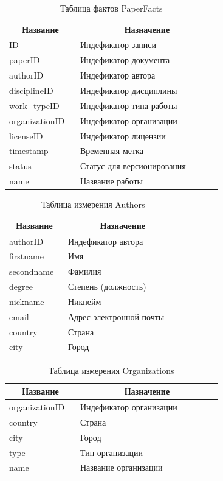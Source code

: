 \documentclass[a4paper,14pt]{extarticle}
\newcommand{\heading}[1]{\multicolumn{1}{|c|}{\textbf{#1}}}
\begin{document}
\begin{table}[htbp]
	\caption{Таблица фактов PaperFacts}
	\begin{tabular}{|p{0.3\linewidth}|p{0.6\linewidth}|}
		\hline
		\heading{Название} & \heading{Назначение} \\ \hline
		ID & Индефикатор записи \\ \hline
		paperID & Индефикатор документа \\ \hline
		authorID & Индефикатор автора \\ \hline
		disciplineID & Индефикатор дисциплины  \\ \hline
		work\_typeID & Индефикатор типа работы \\ \hline
		organizationID & Индефикатор организации \\ \hline
		licenseID & Индефикатор лицензии \\ \hline
		timestamp & Временная метка \\ \hline
		status & Статус для версионирования \\ \hline
		name & Название работы \\ \hline
	\end{tabular}
	\label{tab:facts}
\end{table}


\begin{table}[htbp]
	\caption{Таблица измерения Authors}
	\begin{tabular}{|p{0.3\linewidth}|p{0.6\linewidth}|}
		\hline
		\heading{Название} & \heading{Назначение} \\ \hline
		authorID & Индефикатор автора \\ \hline
		firstname & Имя \\ \hline
		secondname & Фамилия \\ \hline
		degree & Степень (должность) \\ \hline
		nickname & Никнейм \\ \hline
		email & Адрес электронной почты \\ \hline
		country & Страна \\ \hline
		city & Город \\ \hline
	\end{tabular}
	\label{tab:authors}
\end{table}


\begin{table}[htbp]
	\caption{Таблица измерения Organizations}
	\begin{tabular}{|p{0.3\linewidth}|p{0.6\linewidth}|}
		\hline
		\heading{Название} & \heading{Назначение} \\ \hline
		organizationID & Индефикатор организации \\ \hline
		country & Страна \\ \hline
		city & Город \\ \hline
		type & Тип организации \\ \hline
		name & Название организации \\ \hline
	\end{tabular}
	\label{tab:orgs}
\end{table}
\end{document}
